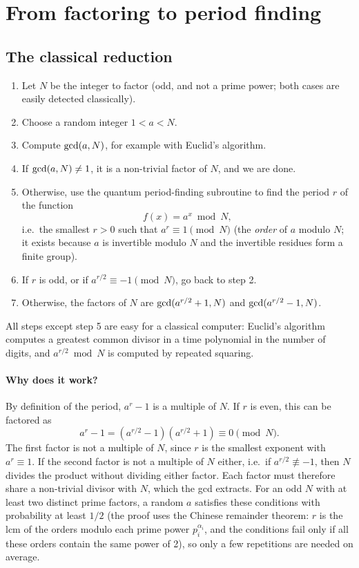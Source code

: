 \section{From factoring to period finding}
\subsection{The classical reduction}
\begin{enumerate}
  \item Let $N$ be the integer to factor (odd, and not a prime power; both cases are easily detected classically).
  \item Choose a random integer $1<a<N$.
  \item Compute $\operatorname{gcd}(a,N)$, for example with Euclid's algorithm.
  \item If $\operatorname{gcd}(a,N)\neq1$, it is a non-trivial factor of $N$, and we are done.
  \item Otherwise, use the quantum period-finding subroutine to find the period $r$ of the function
  \begin{equation}
    f(x)=a^x\bmod N,
  \end{equation}
  i.e.\ the smallest $r>0$ such that $a^r\equiv1\pmod N$ (the \emph{order} of $a$ modulo $N$; it exists because $a$ is invertible modulo $N$ and the invertible residues form a finite group).
  \item If $r$ is odd, or if $a^{r/2}\equiv-1\pmod N$, go back to step 2.
  \item Otherwise, the factors of $N$ are $\operatorname{gcd}(a^{r/2}+1,N)$ and $\operatorname{gcd}(a^{r/2}-1,N)$.
\end{enumerate}
All steps except step 5 are easy for a classical computer: Euclid's algorithm computes a greatest common divisor in a time polynomial in the number of digits, and $a^{r/2}\bmod N$ is computed by repeated squaring.

\paragraph{Why does it work?} By definition of the period, $a^r-1$ is a multiple of $N$. If $r$ is even, this can be factored as
\begin{equation}
  a^r-1=\left(a^{r/2}-1\right)\left(a^{r/2}+1\right)\equiv0\pmod N.
\end{equation}
The first factor is not a multiple of $N$, since $r$ is the smallest exponent with $a^r\equiv1$. If the second factor is not a multiple of $N$ either, i.e.\ if $a^{r/2}\not\equiv-1$, then $N$ divides the product
without dividing either factor. Each factor must therefore share a non-trivial divisor with $N$, which the gcd extracts. For an odd $N$ with at least two distinct prime factors, a random $a$ satisfies these
conditions with probability at least $1/2$ (the proof uses the Chinese remainder theorem: $r$ is the lcm of the orders modulo each prime power $p_i^{\alpha_i}$, and the conditions fail only if all these orders
contain the same power of 2), so only a few repetitions are needed on average.

